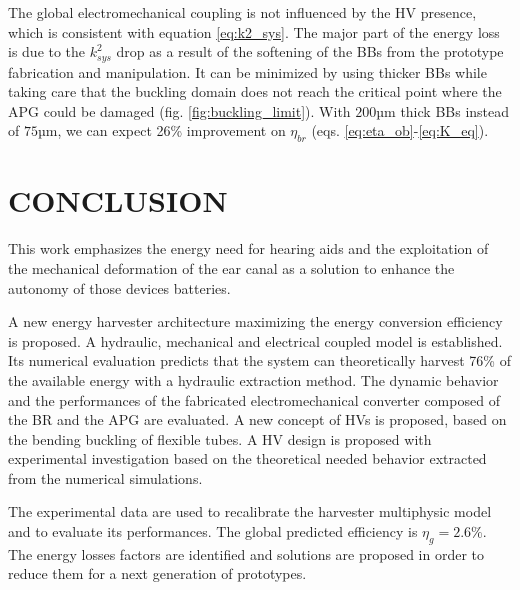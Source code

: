 \documentclass[3p,twocolumn,preprint]{elsarticle}
\begin{document}
The global electromechanical coupling is not influenced by the HV presence, which is consistent with equation \ref{eq:k2_sys}. The major part of the energy loss is due to the $k^2_{sys}$ drop as a result of the softening of the BBs from the prototype fabrication and manipulation. It can be minimized by using thicker BBs while taking care that the buckling domain does not reach the critical point where the APG could be damaged (fig. \ref{fig:buckling_limit}). With $200$µm thick BBs instead of $75$µm, we can expect 26\% improvement on $\eta_{br}$ (eqs. \ref{eq:eta_ob}-\ref{eq:K_eq}).
\section{CONCLUSION}
\label{sec:CONCLUSION}
This work emphasizes the energy need for hearing aids and the exploitation of the mechanical deformation of the ear canal as a solution to enhance the autonomy of those devices batteries.

A new energy harvester architecture maximizing the energy conversion efficiency is proposed. A hydraulic, mechanical and electrical coupled model is established. Its numerical evaluation predicts that the system can theoretically harvest 76\% of the available energy with a hydraulic extraction method. The dynamic behavior and the performances of the fabricated electromechanical converter composed of the BR and the APG are evaluated. A new concept of HVs is proposed, based on the bending buckling of flexible tubes. A HV design is proposed with experimental investigation based on the theoretical needed behavior extracted from the numerical simulations.

The experimental data are used to recalibrate the harvester multiphysic model and to evaluate its performances. The global predicted efficiency is $\eta_g=2.6\%$. The energy losses factors are identified and solutions are proposed in order to reduce them for a next generation of prototypes.







% 
\end{document}

